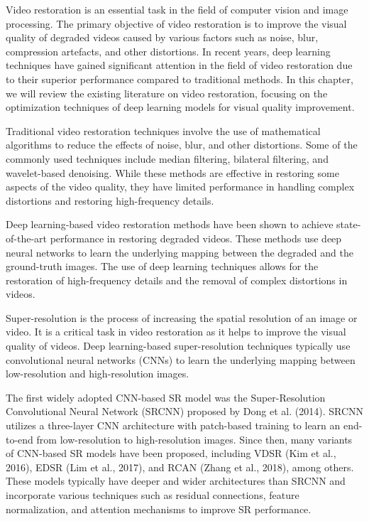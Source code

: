 \label{chap:Background}

Video restoration is an essential task in the field of computer vision and image processing. The primary objective of video restoration is to improve the visual quality of degraded videos caused by various factors such as noise, blur, compression artefacts, and other distortions. In recent years, deep learning techniques have gained significant attention in the field of video restoration due to their superior performance compared to traditional methods. In this chapter, we will review the existing literature on video restoration, focusing on the optimization techniques of deep learning models for visual quality improvement.

Traditional video restoration techniques involve the use of mathematical algorithms to reduce the effects of noise, blur, and other distortions. Some of the commonly used techniques include median filtering, bilateral filtering, and wavelet-based denoising. While these methods are effective in restoring some aspects of the video quality, they have limited performance in handling complex distortions and restoring high-frequency details.

Deep learning-based video restoration methods have been shown to achieve state-of-the-art performance in restoring degraded videos. These methods use deep neural networks to learn the underlying mapping between the degraded and the ground-truth images. The use of deep learning techniques allows for the restoration of high-frequency details and the removal of complex distortions in videos.

Super-resolution is the process of increasing the spatial resolution of an image or video. It is a critical task in video restoration as it helps to improve the visual quality of videos. Deep learning-based super-resolution techniques typically use convolutional neural networks (CNNs) to learn the underlying mapping between low-resolution and high-resolution images.

The first widely adopted CNN-based SR model was the Super-Resolution Convolutional Neural Network (SRCNN) proposed by Dong et al. (2014). SRCNN utilizes a three-layer CNN architecture with patch-based training to learn an end-to-end from low-resolution to high-resolution images. Since then, many variants of CNN-based SR models have been proposed, including VDSR (Kim et al., 2016), EDSR (Lim et al., 2017), and RCAN (Zhang et al., 2018), among others. These models typically have deeper and wider architectures than SRCNN and incorporate various techniques such as residual connections, feature normalization, and attention mechanisms to improve SR performance.
 
